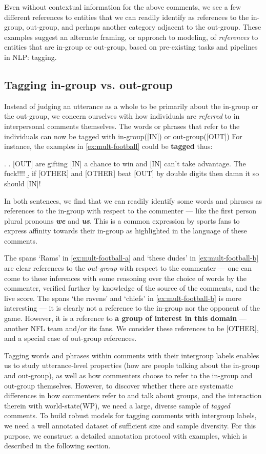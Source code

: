 Even without contextual information for the above comments, we see a few different references to entities that we can readily identify as references to the in-group, out-group, and perhaps another category adjacent to the out-group. These examples suggest an alternate framing, or approach to modeling, of \emph{references} to entities that are in-group or out-group, based on pre-existing tasks and pipelines in NLP: tagging.

\subsection{Tagging in-group vs. out-group}

Instead of judging an utterance as a whole to be primarily about the in-group or the out-group, we concern ourselves with how individuals are \emph{referred} to in interpersonal comments themselves. The words or phrases that refer to the individuals can now be tagged with in-group([IN]) or out-group([OUT]) For instance, the examples in \ref{ex:mult-football} could be \textbf{tagged} thus:

\ex. \a. [OUT] are gifting [IN] a chance to win and [IN] can’t take advantage. The fuck!!!!
     \b. if [OTHER] and [OTHER] beat [OUT] by double digits then damn it so should [IN]!
     
     
In both sentences, we find that we can readily identify some words and phrases as references to the in-group with respect to the commenter --- like the first person plural pronouns \textbf{\emph{we}} and \textbf{\emph{us}}. This is a common expression by sports fans to express affinity towards their in-group as highlighted in the language of these comments.

The spans `Rams' in \ref{ex:mult-football-a} and `these dudes' in \ref{ex:mult-football-b} are clear references to the \emph{out-group} with respect to the commenter --- one can come to these inferences with some reasoning over the choice of words by the commenter, verified further by knowledge of the source of the comments, and the live score. The spans `the ravens' and `chiefs' in \ref{ex:mult-football-b} is more interesting --- it is clearly not a reference to the in-group nor the opponent of the game. However, it is a reference to \textbf{a group of interest in this domain} --- another NFL team and/or its fans. We consider these references to be [OTHER], and a special case of out-group references.

Tagging words and phrases within comments with their intergroup labels enables us to study utterance-level properties (how are people talking about the in-group and out-group), as well as how commenters choose to refer to the in-group and out-group themselves. However, to discover whether there are systematic differences in how commenters refer to and talk about groups, and the interaction therein with world-state(WP), we need a large, diverse sample of \emph{tagged} comments. To build robust models for tagging comments with intergroup labels, we need a well annotated dataset of sufficient size and sample diversity. For this purpose, we construct a detailed annotation protocol with examples, which is described in the following section.

